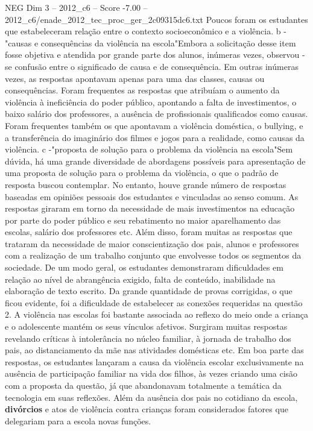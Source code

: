 \begin{textsample}{NEG Dim 3 – 2012\_c6 – Score -7.00 – 2012\_c6/enade\_2012\_tec\_proc\_ger\_2c09315dc6.txt}
Poucos foram os estudantes que estabeleceram relação entre o contexto socioeconômico e a violência. b -"causas e consequências da violência na escola"Embora a solicitação desse item fosse objetiva e atendida por grande parte dos alunos, inúmeras vezes, observou -se confusão entre o significado de causa e de consequência.
Em outras inúmeras vezes, as respostas apontavam apenas para uma das classes, causas ou consequências.
Foram frequentes as respostas que atribuíam o aumento da violência à ineficiência do poder público, apontando a falta de investimentos, o baixo salário dos professores, a ausência de profissionais qualificados como causas.
Foram frequentes também os que apontavam a violência doméstica, o bullying, e a transferência do imaginário dos filmes e jogos para a realidade, como causas da violência. c -"proposta de solução para o problema da violência na escola"Sem dúvida, há uma grande diversidade de abordagens possíveis para apresentação de uma proposta de solução para o problema da violência, o que o padrão de resposta buscou contemplar.
No entanto, houve grande número de respostas baseadas em opiniões pessoais dos estudantes e vinculadas ao senso comum.
As respostas giraram em torno da necessidade de mais investimentos na educação por parte do poder público e seu rebatimento no maior aparelhamento das escolas, salário dos professores etc.
Além disso, foram muitas as respostas que trataram da necessidade de maior conscientização dos pais, alunos e professores com a realização de um trabalho conjunto que envolvesse todos os segmentos da sociedade.
De um modo geral, os estudantes demonstraram dificuldades em relação ao nível de abrangência exigido, falta de conteúdo, inabilidade na elaboração de texto escrito.
Da grande quantidade de provas corrigidas, o que ficou evidente, foi a dificuldade de estabelecer as conexões requeridas na questão 2.
A violência nas escolas foi bastante associada ao reflexo do meio onde a criança e o adolescente mantém os seus vínculos afetivos.
Surgiram muitas respostas revelando críticas à intolerância no núcleo familiar, à jornada de trabalho dos pais, ao distanciamento da mãe nas atividades domésticas etc.
Em boa parte das respostas, os estudantes lançaram a causa da violência escolar exclusivamente na ausência de participação familiar na vida dos filhos, às vezes criando uma cisão com a proposta da questão, já que abandonavam totalmente a temática da tecnologia em suas reflexões.
Além da ausência dos pais no cotidiano da escola, \textbf{divórcios} e atos de violência contra crianças foram considerados fatores que delegariam para a escola novas funções.

\end{textsample}
